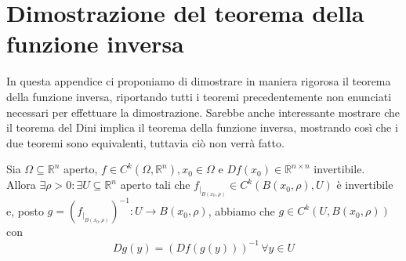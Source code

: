 \chapter{Dimostrazione del teorema della funzione inversa}
\pagestyle{plain}
\thispagestyle{empty}
\pagestyle{fancy}
In questa appendice ci proponiamo di dimostrare in maniera rigorosa il teorema della funzione inversa, riportando tutti i teoremi precedentemente non enunciati necessari per effettuare la dimostrazione. Sarebbe anche interessante mostrare che il teorema del Dini implica il teorema della funzione inversa, mostrando così
che i due teoremi sono equivalenti, tuttavia ciò non verrà fatto.
%
\vspace{0.5cm}
\begin{theorem}[\textcolor{blue}{della funzione inversa}]
    Sia $\Omega \subseteq \mathbb{R}^n$ aperto, $f \in C^k(\Omega, \mathbb{R}^n), x_0 \in \Omega$ e $Df(x_0) \in \mathbb{R}^{n \times n}$ invertibile. \\
    Allora $\exists \rho > 0: \exists U \subseteq \mathbb{R}^n$ aperto tali che $f_{|_{B(x_0, \rho)}} \in C^{k}(B(x_0, \rho), U)$ è invertibile e, posto $g=(f_{|_{B(x_0, \rho)}})^{-1}:U \to B(x_0, \rho)$, abbiamo che
    $g \in C^k(U, B(x_0, \rho))$ con
    \[
    Dg(y) = (Df(g(y)))^{-1} \, \forall y \in U
    \]
    \label{thm:inverse_function}
    \end{theorem}
%
\vspace{0.5cm}
